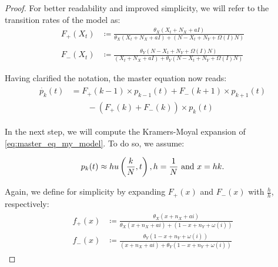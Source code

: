 \documentclass[12pt,a4paper,twoside]{article}
\begin{document}
\begin{proof}
	For better readability and improved simplicity, we will refer to the transition rates of the model as:
	\begin{align*}
	F_+ \left(X_t\right) &\coloneqq\frac{\theta_X (X_t + N_X + aI)}{\theta_X (X_t + N_X + aI) + (N-X_t + N_Y + \Omega\left(I\right) N)} \\
	&\\
	F_- \left(X_t\right) &\coloneqq\frac{\theta_Y(N-X_t + N_Y + \Omega\left(I\right) N)}{(X_t + N_X + aI) + \theta_Y(N-X_t + N_Y + \Omega\left(I\right) N)}
	\end{align*}
	
	Having clarified the notation, the master equation now reads:
	\begin{align}\label{eq:master_eq_my_model}
	\begin{split}
	\dot{p_k}\left(t\right) &= F_+ \left(k-1\right)\times p_{k-1}\left(t\right) + F_- \left(k+1\right)\times p_{k+1}\left(t\right)\\
	&\qquad - \left(F_+\left(k\right) + F_-\left(k\right)\right)\times p_k\left(t\right)
	\end{split}
	\end{align}
	
	In the next step, we will compute the Kramers-Moyal expansion of \eqref{eq:master_eq_my_model}. To do so, we assume:
	
	\begin{equation}\label{eq:kramers_moyal_assumptions}
	p_k(t) \approx hu\left(\frac{k}{N}, t\right), h=\frac{1}{N}\textnormal{ and }x = hk.
	\end{equation} 
	
	Again, we define for simplicity by expanding $F_+(x)$ and $F_-(x)$ with $\frac{h}{h}$, respectively:
	\begin{align}\label{def:abbreviation_scaled_transition_rates}
	\begin{split}
	f_+(x) &\coloneqq \frac{\theta_X (x+ n_X+ ai)}{\theta_X (x + n_X + ai) + (1-x + n_Y + \omega\left(i\right))}\\
	f_-(x) &\coloneqq \frac{\theta_Y(1-x+n_Y+\omega\left(i\right))}{(x+n_X+ai) + \theta_Y(1-x+n_Y+\omega\left(i\right))}
	\end{split}
	\end{align}
	

\end{proof}
\end{document}
